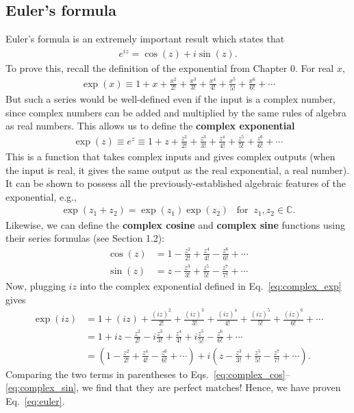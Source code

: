 \documentclass[10pt,a4paper]{article}
\begin{document}
\subsection{Euler's formula}
\label{eulers-formula}

Euler's formula is an extremely important result which states that
\begin{align}
  e^{iz} = \cos(z) + i \sin(z).
  \label{eq:euler}
\end{align}
To prove this, recall the definition of the exponential from Chapter
0.  For real $x$,
\begin{align}
  \exp(x) \equiv 1 + x + \frac{x^2}{2!} + \frac{x^3}{3!} + \frac{x^4}{4!} + \frac{x^5}{5!} + \frac{x^6}{6!} + \cdots
\end{align}
But such a series would be well-defined even if the input is a complex
number, since complex numbers can be added and multiplied by the same
rules of algebra as real numbers. This allows us to define the
\textbf{complex exponential}
\begin{align}
  \exp(z) \equiv e^z \equiv 1 + z + \frac{z^2}{2!} + \frac{z^3}{3!} + \frac{z^4}{4!} + \frac{z^5}{5!} + \frac{z^6}{6!} + \cdots
  \label{eq:complex_exp}
\end{align}
This is a function that takes complex inputs and gives complex outputs
(when the input is real, it gives the same output as the real
exponential, a real number). It can be shown to possess all the
previously-established algebraic features of the exponential, e.g.,
\begin{align}
  \exp(z_1 + z_2) = \exp(z_1) \exp(z_2) \;\;\;\mathrm{for}\;\; z_1, z_2 \in \mathbb{C}.
\end{align}
Likewise, we can define the \textbf{complex cosine} and
\textbf{complex sine} functions using their series formulas (see
Section 1.2):
\begin{align}
  \cos(z) &= 1 - \frac{z^2}{2!} + \frac{z^4}{4!} - \frac{z^6}{6!} + \cdots
  \label{eq:complex_cos} \\
  \sin(z) &= z - \frac{z^3}{3!} + \frac{z^5}{5!} - \frac{z^7}{7!} + \cdots
  \label{eq:complex_sin}
\end{align}
Now, plugging $iz$ into the complex exponential defined in
Eq.~\eqref{eq:complex_exp} gives
\begin{align}
  \exp(iz) &= 1 + (iz) + \frac{(iz)^2}{2!} + \frac{(iz)^3}{3!} + \frac{(iz)^4}{4!} + \frac{(iz)^5}{5!} + \frac{(iz)^6}{6!} + \cdots \\
  &= 1 + iz - \frac{z^2}{2!} - i \frac{z^3}{3!} + \frac{z^4}{4!} + i \frac{z^5}{5!} - \frac{z^6}{6!} + \cdots \\
  & = \left(1 - \frac{z^2}{2!} + \frac{z^4}{4!} - \frac{z^6}{6!} + \cdots\right) + i\left(z  - \frac{z^3}{3!}  + \frac{z^5}{5!}  - \frac{z^7}{7!} + \cdots\right).
\end{align}
Comparing the two terms in parentheses to
Eqs.~\eqref{eq:complex_cos}--\eqref{eq:complex_sin}, we find that they
are perfect matches! Hence, we have proven Eq.~\eqref{eq:euler}.
\end{document}
